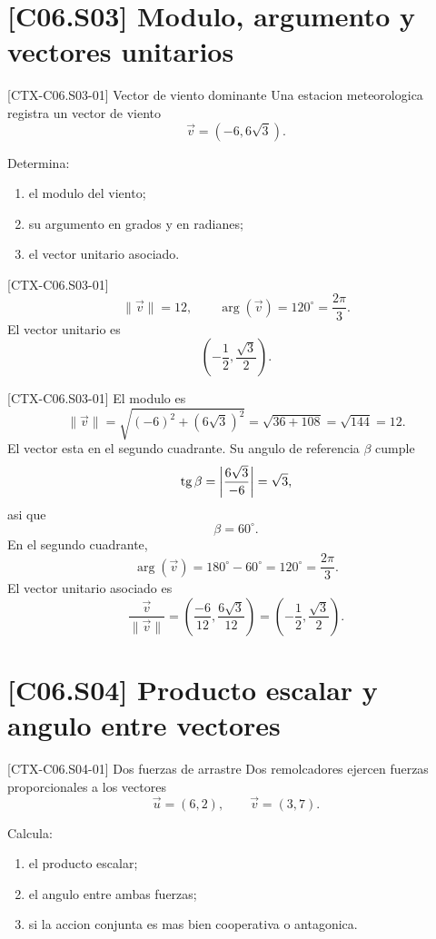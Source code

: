 \section{[C06.S03] Modulo, argumento y vectores unitarios}

\begin{exercise}{[CTX-C06.S03-01] Vector de viento dominante}
Una estacion meteorologica registra un vector de viento
\[
\vec v=(-6,6\sqrt{3}).
\]

Determina:
\begin{enumerate}
  \item el modulo del viento;
  \item su argumento en grados y en radianes;
  \item el vector unitario asociado.
\end{enumerate}
\end{exercise}

\begin{shortanswer}{[CTX-C06.S03-01]}
\[
\|\vec v\|=12,
\qquad
\arg(\vec v)=120^\circ=\frac{2\pi}{3}.
\]
El vector unitario es
\[
\left(-\frac12,\frac{\sqrt3}{2}\right).
\]
\end{shortanswer}

\begin{fullsolution}{[CTX-C06.S03-01]}
El modulo es
\[
\|\vec v\|=\sqrt{(-6)^2+(6\sqrt3)^2}=\sqrt{36+108}=\sqrt{144}=12.
\]
El vector esta en el segundo cuadrante. Su angulo de referencia \(\beta\) cumple
\[
\operatorname{tg}\beta=\left|\frac{6\sqrt3}{-6}\right|=\sqrt3,
\]
asi que
\[
\beta=60^\circ.
\]
En el segundo cuadrante,
\[
\arg(\vec v)=180^\circ-60^\circ=120^\circ=\frac{2\pi}{3}.
\]
El vector unitario asociado es
\[
\frac{\vec v}{\|\vec v\|}=
\left(\frac{-6}{12},\frac{6\sqrt3}{12}\right)=
\left(-\frac12,\frac{\sqrt3}{2}\right).
\]
\end{fullsolution}

\section{[C06.S04] Producto escalar y angulo entre vectores}

\begin{exercise}{[CTX-C06.S04-01] Dos fuerzas de arrastre}
Dos remolcadores ejercen fuerzas proporcionales a los vectores
\[
\vec u=(6,2),
\qquad
\vec v=(3,7).
\]

Calcula:
\begin{enumerate}
  \item el producto escalar;
  \item el angulo entre ambas fuerzas;
  \item si la accion conjunta es mas bien cooperativa o antagonica.
\end{enumerate}
\end{exercise}

